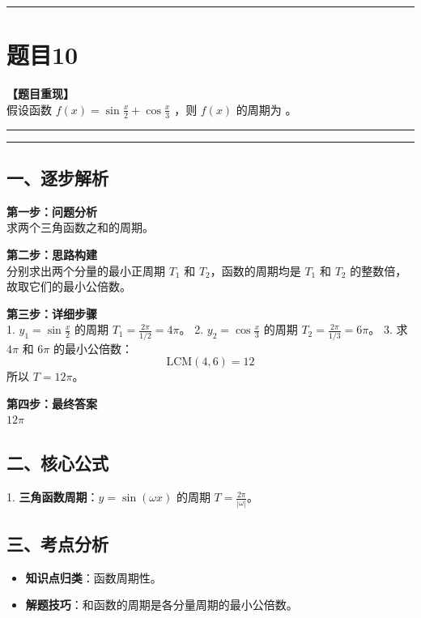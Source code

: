 \documentclass[12pt, a4paper]{ctexart}
\newcommand{\TopSeparator}{
    \par\noindent\rule{\textwidth}{1.5pt}\vspace{0.5em} %
}
\newcommand{\AnalysisSeparator}{
    \par\noindent\rule{\textwidth}{0.5pt}\vspace{0.2em}\hrule\vspace{0.5em} %
}
\newenvironment{RedAnalysis}{
    \par
    \color{red} %
}{
    \par
    \color{black} %
}
\begin{document}
\TopSeparator
\section*{题目10}

\textbf{【题目重现】} \\
假设函数 $ f(x) = \sin\frac{x}{2} + \cos\frac{x}{3} $ ，则 $ f(x) $ 的周期为 \underline{\hspace{2cm}}。

\AnalysisSeparator

\begin{RedAnalysis}

\subsection*{一、逐步解析}

\textbf{第一步：问题分析} \\
求两个三角函数之和的周期。

\textbf{第二步：思路构建} \\
分别求出两个分量的最小正周期 $T_1$ 和 $T_2$，函数的周期均是 $T_1$ 和 $T_2$ 的整数倍，故取它们的最小公倍数。

\textbf{第三步：详细步骤} \\
1. $y_1 = \sin \frac{x}{2}$ 的周期 $T_1 = \frac{2\pi}{1/2} = 4\pi$。
2. $y_2 = \cos \frac{x}{3}$ 的周期 $T_2 = \frac{2\pi}{1/3} = 6\pi$。
3. 求 $4\pi$ 和 $6\pi$ 的最小公倍数：
   \[ \text{LCM}(4, 6) = 12 \]
   所以 $T = 12\pi$。

\textbf{第四步：最终答案} \\
$12\pi$

\subsection*{二、核心公式}
1. \textbf{三角函数周期}：$y = \sin(\omega x)$ 的周期 $T = \frac{2\pi}{|\omega|}$。

\subsection*{三、考点分析}
\begin{itemize}
    \item \textbf{知识点归类}：函数周期性。
    \item \textbf{解题技巧}：和函数的周期是各分量周期的最小公倍数。
\end{itemize}

\end{RedAnalysis}
\end{document}
